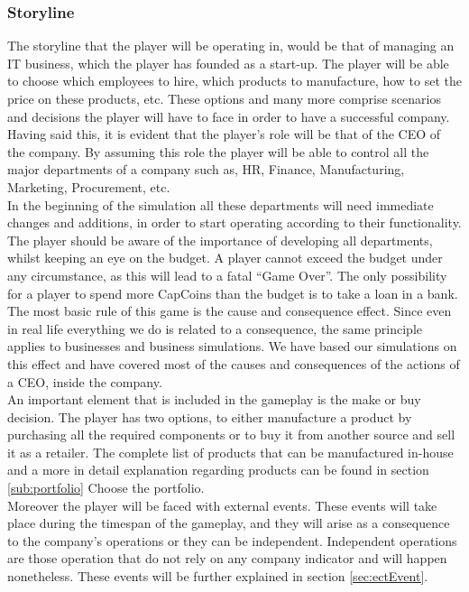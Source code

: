 \documentclass[11pt,titlepage,oneside,openany]{book}
\begin{document}
\subsubsection{Storyline}
 The storyline that the player will be operating in, would be that of managing an IT business, which the player has founded as a start-up. The player will be able to choose which employees to hire, which products to manufacture,  how to set the price on these products, etc. These options and many more comprise scenarios and decisions the player will have to face in order to have a successful company. Having said this, it is evident that the player’s role will be that of the CEO of the company. By assuming this role the player will be able to control all the major departments of a company such as, HR, Finance, Manufacturing, Marketing, Procurement, etc. \\
In the beginning of the simulation all these departments will need immediate changes and additions, in order to start operating according to their functionality. The player should be aware of the importance of developing all departments, whilst keeping an eye on the budget. A player cannot exceed the budget under any circumstance, as this will lead to a fatal “Game Over”. The only possibility for a player to spend more CapCoins than the budget is to take a loan in a bank. \\
The most basic rule of this game is the cause and consequence effect. Since even in real life everything we do is related to a consequence, the same principle applies to businesses and business simulations. We have based our simulations on this effect and have covered most of the causes and consequences of the actions of a CEO, inside the company. \\
An important element that is included in the gameplay is the make or buy decision. The player has two options, to either manufacture a product by purchasing all the required components or to buy it from another source and sell it as a retailer. The complete list of products that can be manufactured in-house and a more in detail explanation regarding products can be found in section \ref{sub:portfolio} Choose the portfolio. \\
Moreover the player will be faced with external events. These events will take place during the timespan of the gameplay, and they will arise as a consequence to the company’s operations or they can be independent. Independent operations are those operation that do not rely on any company indicator and will happen nonetheless. These events will be further explained in section \ref{sec:ectEvent}.	
\end{document}
